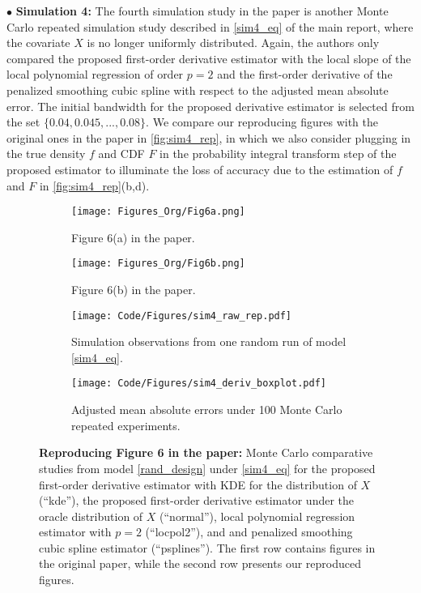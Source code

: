 \documentclass{uwstat572}
\theoremstyle{definition}
\theoremstyle{theorem}
\begin{document}
$\bullet$ {\bf Simulation 4:} The fourth simulation study in the paper \citep{liu2020smoothed} is another Monte Carlo repeated simulation study described in \eqref{sim4_eq} of the main report, where the covariate $X$ is no longer uniformly distributed. Again, the authors only compared the proposed first-order derivative estimator with the local slope of the local polynomial regression of order $p=2$ and the first-order derivative of the penalized smoothing cubic spline with respect to the adjusted mean absolute error. The initial bandwidth for the proposed derivative estimator is selected from the set $\{0.04, 0.045,...,0.08\}$. We compare our reproducing figures with the original ones in the paper in \autoref{fig:sim4_rep}, in which we also consider plugging in the true density $f$ and CDF $F$ in the probability integral transform step of the proposed estimator to illuminate the loss of accuracy due to the estimation of $f$ and $F$ in \autoref{fig:sim4_rep}(b,d).

\begin{figure}[!t]
	\captionsetup[subfigure]{justification=centering}
	\begin{subfigure}[t]{0.49\linewidth}
		\centering
		\texttt{[image: Figures\_Org/Fig6a.png]}
		\caption{Figure 6(a) in the paper.}
	\end{subfigure}
	\hfil
	\begin{subfigure}[t]{0.49\linewidth}
		\centering
		\texttt{[image: Figures\_Org/Fig6b.png]}
		\caption{Figure 6(b) in the paper.}
	\end{subfigure}
	\begin{subfigure}[t]{0.49\linewidth}
		\centering
		\texttt{[image: Code/Figures/sim4\_raw\_rep.pdf]}
		\caption{Simulation observations from one random run of model \eqref{sim4_eq}.}
	\end{subfigure}
	\hfil
	\begin{subfigure}[t]{0.49\linewidth}
		\centering
		\texttt{[image: Code/Figures/sim4\_deriv\_boxplot.pdf]}
		\caption{Adjusted mean absolute errors under 100 Monte Carlo repeated experiments.}
	\end{subfigure}
	\caption{{\bf Reproducing Figure 6 in the paper:} Monte Carlo comparative studies from model \eqref{rand_design} under \eqref{sim4_eq} for the proposed first-order derivative estimator with KDE for the distribution of $X$ (``kde''), the proposed first-order derivative estimator under the oracle distribution of $X$ (``normal''), local polynomial regression estimator with $p=2$ (``locpol2''), and and penalized smoothing cubic spline estimator (``psplines''). The first row contains figures in the original paper, while the second row presents our reproduced figures.}
	\label{fig:sim4_rep}
\end{figure}
\end{document}
